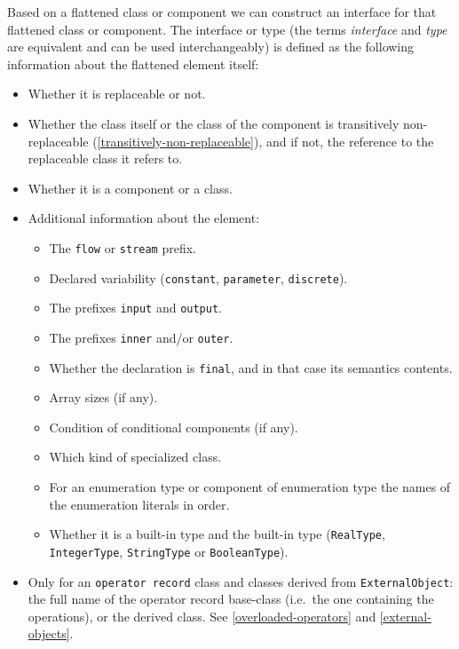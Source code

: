 Based on a flattened class or component we can construct an interface
for that flattened class or component. The interface or type
(the terms \emph{interface} and \emph{type} are equivalent and can be used
interchangeably) is defined as the following information about the
flattened element itself:
\begin{itemize}
\item
  Whether it is replaceable or not.
\item
  Whether the class itself or the class of the component is transitively
  non-replaceable (\cref{transitively-non-replaceable}), and if not, the reference to the
  replaceable class it refers to.
\item
  Whether it is a component or a class.
\item
  Additional information about the element:

  \begin{itemize}
  \item
    The \lstinline!flow! or \lstinline!stream! prefix.
  \item
    Declared variability (\lstinline!constant!, \lstinline!parameter!, \lstinline!discrete!).
  \item
    The prefixes \lstinline!input! and \lstinline!output!.
  \item
    The prefixes \lstinline!inner! and/or \lstinline!outer!.
  \item
    Whether the declaration is \lstinline!final!, and in that case its semantics
    contents.
  \item
    Array sizes (if any).
  \item
    Condition of conditional components (if any).
  \item
    Which kind of specialized class.
  \item
    For an enumeration type or component of enumeration type the names
    of the enumeration literals in order.
  \item
    Whether it is a built-in type and the built-in type (\lstinline!RealType!,
    \lstinline!IntegerType!, \lstinline!StringType! or \lstinline!BooleanType!).
  \end{itemize}
\item
  Only for an \lstinline!operator record! class and classes derived from \lstinline!ExternalObject!: the full name of the operator record base-class
  (i.e.\  the one containing the operations), or the derived class.  See \cref{overloaded-operators} and \cref{external-objects}.


\end{itemize}
